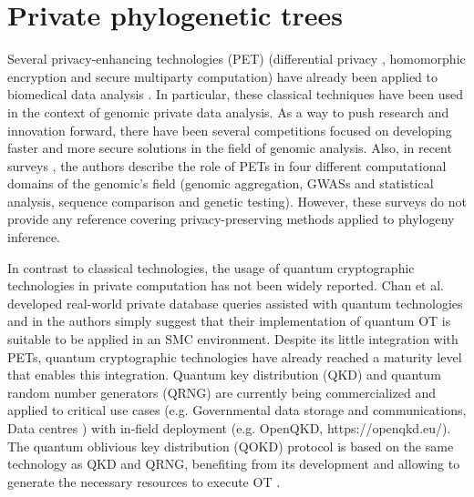


%

\chapter{Private phylogenetic trees}

Several privacy-enhancing technologies (PET) (differential privacy \cite{Li2016}, homomorphic encryption \cite{Armknecht2015} and secure multiparty computation) have already been applied to biomedical data analysis \cite{Verhaert2018, Scardapane2017, Maulany2018, Kikuchi2018, Tawfik2018}. In particular, these classical techniques have been used in the context of genomic private data analysis. As a way to push research and innovation forward, there have been several competitions \cite{Wang2017} focused on developing faster and more secure solutions in the field of genomic analysis. Also, in recent surveys \cite{MY19, Naveed2015}, the authors describe the role of PETs in four different computational domains of the genomic's field (genomic aggregation, GWASs and statistical analysis, sequence comparison and genetic testing). However, these surveys do not provide any reference covering privacy-preserving methods applied to phylogeny inference. 

In contrast to classical technologies, the usage of quantum cryptographic technologies in private computation has not been widely reported. Chan et al. \cite{Chan2014} developed real-world private database queries assisted with quantum technologies and in \cite{Ito2017} the authors simply suggest that their implementation of quantum OT is suitable to be applied in an SMC environment. %
Despite its little integration with PETs, quantum cryptographic technologies have already reached a maturity level that enables this integration. Quantum key distribution (QKD) and quantum random number generators (QRNG) are currently being commercialized and applied to critical use cases (e.g. Governmental data storage and communications, Data centres \cite{AM19}) with in-field deployment (e.g. OpenQKD, https://openqkd.eu/). The quantum oblivious key distribution (QOKD) protocol is based on the same technology as QKD and QRNG, benefiting from its development and allowing to generate the necessary resources to execute OT \cite{Lemus20, JSGBBWZ11, KWW12}. 


